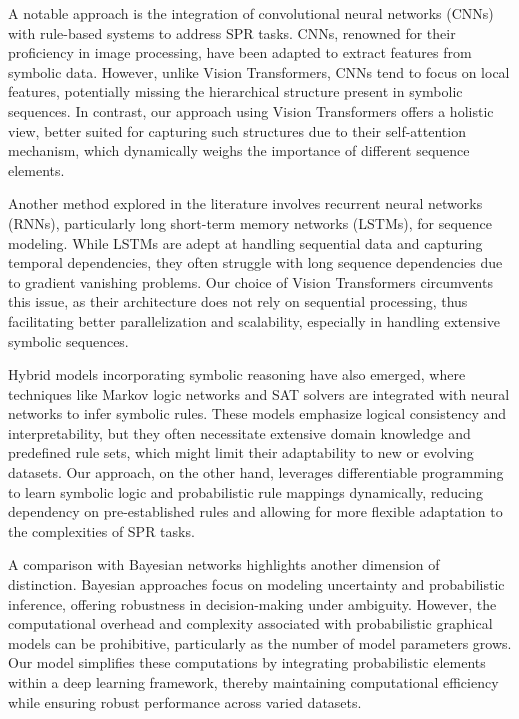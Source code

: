 \documentclass{article}
\begin{document}
A notable approach is the integration of convolutional neural networks (CNNs) with rule-based systems to address SPR tasks. CNNs, renowned for their proficiency in image processing, have been adapted to extract features from symbolic data. However, unlike Vision Transformers, CNNs tend to focus on local features, potentially missing the hierarchical structure present in symbolic sequences. In contrast, our approach using Vision Transformers offers a holistic view, better suited for capturing such structures due to their self-attention mechanism, which dynamically weighs the importance of different sequence elements.

Another method explored in the literature involves recurrent neural networks (RNNs), particularly long short-term memory networks (LSTMs), for sequence modeling. While LSTMs are adept at handling sequential data and capturing temporal dependencies, they often struggle with long sequence dependencies due to gradient vanishing problems. Our choice of Vision Transformers circumvents this issue, as their architecture does not rely on sequential processing, thus facilitating better parallelization and scalability, especially in handling extensive symbolic sequences.

Hybrid models incorporating symbolic reasoning have also emerged, where techniques like Markov logic networks and SAT solvers are integrated with neural networks to infer symbolic rules. These models emphasize logical consistency and interpretability, but they often necessitate extensive domain knowledge and predefined rule sets, which might limit their adaptability to new or evolving datasets. Our approach, on the other hand, leverages differentiable programming to learn symbolic logic and probabilistic rule mappings dynamically, reducing dependency on pre-established rules and allowing for more flexible adaptation to the complexities of SPR tasks.

A comparison with Bayesian networks highlights another dimension of distinction. Bayesian approaches focus on modeling uncertainty and probabilistic inference, offering robustness in decision-making under ambiguity. However, the computational overhead and complexity associated with probabilistic graphical models can be prohibitive, particularly as the number of model parameters grows. Our model simplifies these computations by integrating probabilistic elements within a deep learning framework, thereby maintaining computational efficiency while ensuring robust performance across varied datasets.
\end{document}
